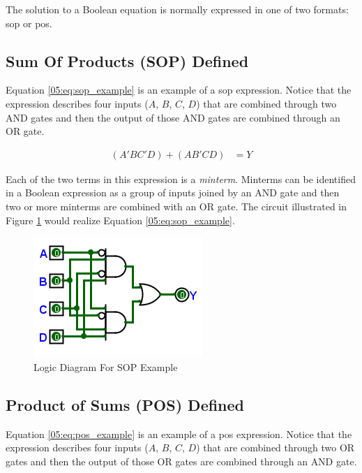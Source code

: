 The solution to a Boolean equation is normally expressed in one of two formats: \gls{sop} or \gls{pos}.

\subsection{Sum Of Products (SOP) Defined}
\label{05:subsec:sum_of_products_sop_defined}

Equation \ref{05:eq:sop_example} is an example of a \gls{sop} expression. Notice that the expression describes four inputs ($ A $, $ B $, $ C $, $ D $) that are combined through two \textsf{AND} gates and then the output of those \textsf{AND} gates are combined through an \textsf{OR} gate. 

\begin{align}
  \label{05:eq:sop_example}
  (A'BC'D)+(AB'CD) &= Y
\end{align}

Each of the two terms in this expression is a \emph{minterm}. Minterms can be identified in a Boolean expression as a group of inputs joined by an \textsf{AND} gate and then two or more minterms are combined with an \textsf{OR} gate. The circuit illustrated in Figure \ref{fig:05_02} would realize Equation \ref{05:eq:sop_example}.

\begin{figure}[H]
	\centering
	\includegraphics[width=\maxwidth{.95\linewidth}]{gfx/05_02}
	\caption{Logic Diagram For SOP Example}
	\label{fig:05_02}
\end{figure}

\subsection{Product of Sums (POS) Defined}
\label{05:subsec:product_of_sums_pos_defined}

Equation \ref{05:eq:pos_example} is an example of a \gls{pos} expression. Notice that the expression describes four inputs ($ A $, $ B $, $ C $, $ D $) that are combined through two \textsf{OR} gates and then the output of those \textsf{OR} gates are combined through an \textsf{AND} gate. 


